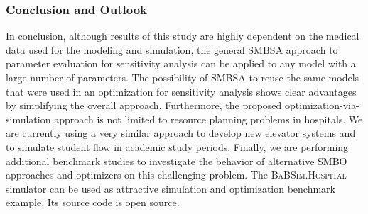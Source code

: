 \documentclass[conference]{IEEEtran}
\newcommand{\babsimhospital}{\textsc{BaBSim.Hospital}\xspace}
\begin{document}
\subsubsection*{Conclusion and Outlook}
In conclusion, although results of this study are highly dependent on the medical data used for the modeling and simulation, the general \gls{SMBSA} approach to parameter evaluation for sensitivity analysis can be applied to any model with a large number of parameters.
The possibility of \gls{SMBSA} to reuse the same models that were used in an optimization for sensitivity analysis shows clear advantages by simplifying the overall approach.
Furthermore, the proposed optimization-via-simulation approach is not limited to resource planning problems in hospitals.
We are currently using a very similar approach to develop new elevator systems and to simulate student flow in academic study periods.
Finally, we are performing additional benchmark studies to investigate the behavior of alternative \gls{SMBO} approaches and optimizers on this challenging problem.
The \babsimhospital simulator can be used as attractive simulation and optimization benchmark example. Its source code is open source. 





\end{document}
